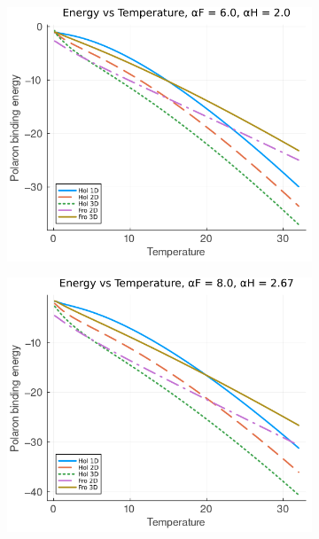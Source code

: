 \begin{figure}[!tbp]
\begin{subfigure}[b]{0.49\textwidth}
  \end{subfigure}
  \begin{subfigure}[b]{0.49\textwidth}
    \includegraphics[width=\textwidth]{figures/energy_temp_6_2.png}
  \end{subfigure}
  \hfill
  \begin{subfigure}[b]{0.49\textwidth}
    \includegraphics[width=\textwidth]{figures/energy_temp_8_267.png}
  \end{subfigure}
  \begin{subfigure}[b]{0.49\textwidth}

\end{subfigure}
\end{figure}
